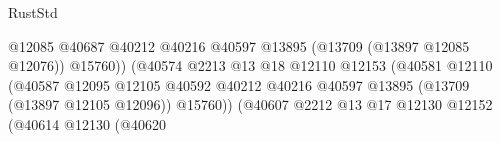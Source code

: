 \begin{lexlean}{RustStd}
\begin{coremodule}
                                                                  @12085
                                                                  @40687
                                                                  @40212
                                                                  @40216
                                                                  @40597
                                                                  @13895
                                                                  (@13709 (@13897 @12085 @12076))
                                                                  @15760))
                                                              (@40574
                                                                @2213
                                                                @13
                                                                @18
                                                                @12110
                                                                @12153
                                                                (@40581
                                                                  @12110
                                                                  (@40587
                                                                    @12095
                                                                    @12105
                                                                    @40592
                                                                    @40212
                                                                    @40216
                                                                    @40597
                                                                    @13895
                                                                    (@13709 (@13897 @12105 @12096))
                                                                    @15760))
                                                                (@40607
                                                                  @2212
                                                                  @13
                                                                  @17
                                                                  @12130
                                                                  @12152
                                                                  (@40614
                                                                    @12130
                                                                    (@40620

\end{coremodule}
\end{lexlean}
